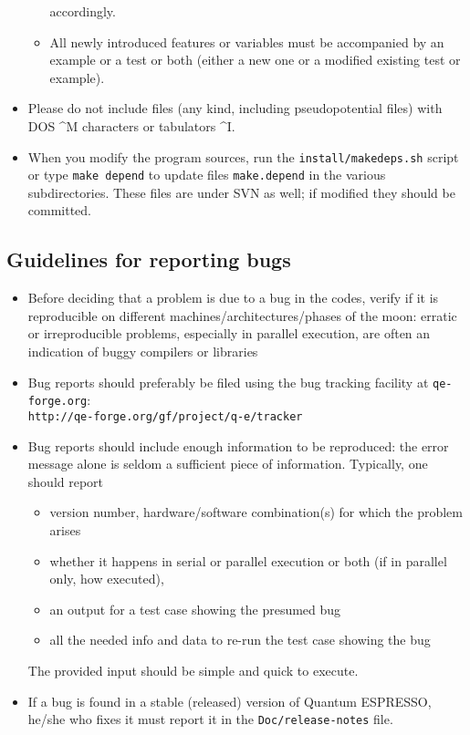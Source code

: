 \documentclass[12pt,a4paper]{article}
\def\qe{{\sc Quantum ESPRESSO}}
\def\qeforge{\texttt{qe-forge.org}}
\begin{document}
\begin{itemize}
\begin{itemize}
accordingly.
\item All newly introduced features or variables must be
accompanied by an example or a test or both (either a
new one or a modified existing test or example).
\end{itemize}
\item Please do not include files (any kind, including
pseudopotential files) with DOS \^{}M characters or
tabulators \^{}I.
\item When you modify the program sources, run the
\texttt{install/makedeps.sh}  script  or type \texttt{make depend}
to update files \texttt{make.depend} in the various
subdirectories. These files are under SVN as well;
if modified they should be committed.
\end{itemize}

\subsection{Guidelines for reporting bugs}

\label{SubSec:Bugs}
\begin{itemize}
\item Before deciding that a problem is due to a bug in the codes,
verify if it is reproducible on different machines/architectures/phases
of the moon: erratic or irreproducible problems, especially in parallel
execution, are often an indication of buggy compilers or libraries
\item Bug reports should preferably be filed using the bug tracking
facility at \qeforge:\\
\texttt{http://qe-forge.org/gf/project/q-e/tracker}
\item Bug reports should include enough information to be reproduced:
the error message alone is seldom a sufficient piece of information.
Typically, one should report
\begin{itemize}
\item version number, hardware/software combination(s) for which
     the problem arises
\item whether it happens in serial or parallel execution or both
(if in parallel only, how executed),
\item an output for a test case showing the presumed bug
\item all the needed info and data to re-run the test case showing
the bug
\end{itemize}
The provided input should be simple and quick to execute.
\item If a bug is found in a stable (released) version of \qe,
  he/she who fixes it must report it in the \texttt{Doc/release-notes}
  file.
\end{itemize}
\end{document}
